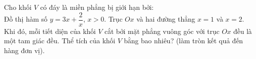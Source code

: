 \begin{bt}%
	Cho khối $V$  có đáy là miền phẳng bị giới hạn bởi:\\
	Đồ thị hàm số $y=3x+\dfrac{2}{x}$, $x>0$. Trục $Ox$ và hai đường thẳng $x=1$ và $x=2$. Khi đó,  mỗi tiết diện của khối $V$ cắt bởi mặt phẳng vuông góc với trục $Ox$ đều là một tam giác đều. Thể tích của khối $V$ bằng bao nhiêu? (làm tròn kết quả đến hàng đơn vị).
\end{bt}

